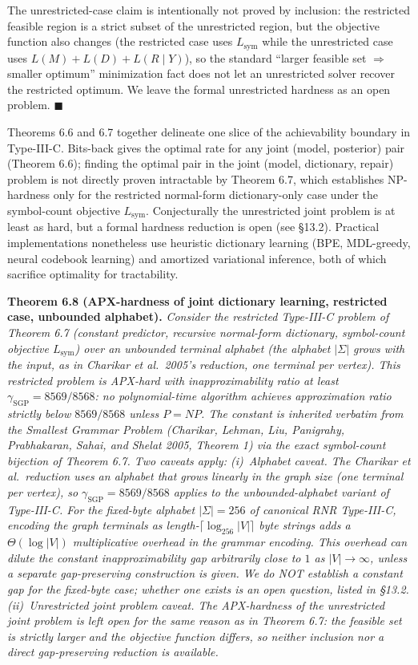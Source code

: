 \documentclass[
]{article}
\begin{document}
The unrestricted-case claim is intentionally not proved by inclusion:
the restricted feasible region is a strict subset of the unrestricted
region, but the objective function also changes (the restricted case
uses $L_{\mathrm{sym}}$ while the unrestricted case uses
$L(M) + L(D) + L(R\mid Y)$), so the standard ``larger feasible set
$\Rightarrow$ smaller optimum'' minimization fact does not let an
unrestricted solver recover the restricted optimum. We leave the
formal unrestricted hardness as an open problem.
\hfill$\blacksquare$

Theorems 6.6 and 6.7 together delineate one slice of the
achievability boundary in Type-III-C. Bits-back gives the optimal
rate for any joint (model, posterior) pair (Theorem 6.6); finding
the optimal pair in the joint (model, dictionary, repair) problem
is not directly proven intractable by Theorem 6.7, which establishes
NP-hardness only for the restricted normal-form dictionary-only
case under the symbol-count objective $L_{\mathrm{sym}}$.
Conjecturally the unrestricted joint problem is at least as hard,
but a formal hardness reduction is open (see §13.2). Practical
implementations nonetheless use heuristic dictionary learning (BPE,
MDL-greedy, neural codebook learning) and amortized variational
inference, both of which sacrifice optimality for tractability.

\textbf{Theorem 6.8 (APX-hardness of joint
dictionary learning, restricted case, unbounded alphabet).}
\emph{Consider the restricted Type-III-C problem of Theorem 6.7
(constant predictor, recursive normal-form dictionary, symbol-count
objective $L_{\mathrm{sym}}$) over an \emph{unbounded terminal
alphabet} (the alphabet $|\Sigma|$ grows with the input, as in
Charikar et al.\ 2005's reduction, one terminal per vertex). This
restricted problem is APX-hard with inapproximability ratio at least
$\gamma_{\mathrm{SGP}} = 8569/8568$: no polynomial-time algorithm
achieves approximation ratio strictly below $8569/8568$ unless
$P = NP$. The constant is inherited verbatim from the Smallest
Grammar Problem (Charikar, Lehman, Liu, Panigrahy, Prabhakaran,
Sahai, and Shelat 2005, Theorem 1) via the exact symbol-count
bijection of Theorem 6.7. Two caveats apply:
(i)~\emph{Alphabet caveat.} The Charikar et al.\ reduction uses an
alphabet that grows linearly in the graph size (one terminal per
vertex), so $\gamma_{\mathrm{SGP}} = 8569/8568$ applies to the
\emph{unbounded-alphabet} variant of Type-III-C. For the fixed-byte
alphabet $|\Sigma| = 256$ of canonical RNR Type-III-C, encoding the
graph terminals as length-$\lceil \log_{256} |V| \rceil$ byte
strings adds a $\Theta(\log |V|)$ multiplicative overhead in the
grammar encoding. This overhead can dilute the constant
inapproximability gap arbitrarily close to $1$ as $|V| \to \infty$,
unless a separate gap-preserving construction is given. We do NOT
establish a constant gap for the fixed-byte case; whether one
exists is an open question, listed in §13.2. (ii)~\emph{Unrestricted joint problem caveat.} The
APX-hardness of the unrestricted joint problem is left open for the
same reason as in Theorem 6.7: the feasible set is strictly larger
and the objective function differs, so neither inclusion nor a
direct gap-preserving reduction is available.}
\end{document}
